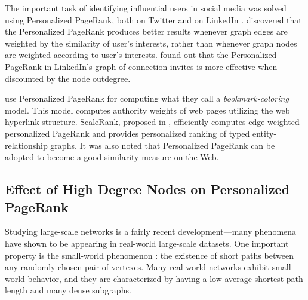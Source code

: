 \documentclass[11pt,oneside]{book}
\let\Oldsubsection\subsection
\renewcommand{\subsection}{\FloatBarrier\Oldsubsection}
\begin{document}
The important task of identifying influential users in social media was solved using Personalized PageRank, both on Twitter \citep{weng2010twitterrank} and on LinkedIn \citep{budalakoti2012}. \cite{weng2010twitterrank} discovered that the Personalized PageRank produces better results whenever graph edges are weighted by the similarity of user’s interests, rather than whenever graph nodes are weighted according to user's interests. \cite{budalakoti2012} found out that the Personalized PageRank in LinkedIn's graph of connection invites is more effective when discounted by the node outdegree.

\cite{berkhin2006bookmark} use Personalized PageRank for computing what they call a \textit{bookmark-coloring} model. This model computes authority weights of web pages utilizing the web hyperlink structure. ScaleRank, proposed in \citep{hristidis2014efficient}, efficiently computes edge-weighted personalized PageRank and provides personalized ranking of typed entity-relationship graphs. It was also noted \citep{sarkar2008fast} that Personalized PageRank can be adopted to become a good similarity measure on the Web.

\subsection{Effect of High Degree Nodes on Personalized PageRank}
\label{sec:ppr_high_degree}
Studying large-scale networks is a fairly recent development---many phenomena have shown to be appearing in real-world large-scale datasets. One important property is the small-world phenomenon \citep{watts1998collective}: the existence of short paths between any randomly-chosen pair of vertexes. Many real-world networks exhibit small-world behavior, and they are characterized by having a low average shortest path length and many dense subgraphs.
\end{document}

